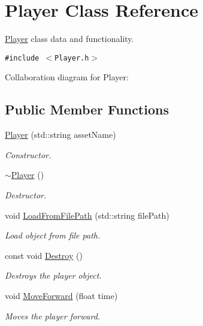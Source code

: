 \hypertarget{class_player}{
\section{Player Class Reference}
\label{class_player}
}
\hyperlink{class_player}{Player} class data and functionality.  


{\tt \#include $<$Player.h$>$}

Collaboration diagram for Player:\subsection*{Public Member Functions}
\begin{CompactItemize}
\item 
\hyperlink{class_player_1608a9c58abd8e3a681f683672b25601}{Player} (std::string assetName)
\begin{CompactList}\small\item\em Constructor. \item\end{CompactList}\item 
\hyperlink{class_player_749d2c00e1fe0f5c2746f7505a58c062}{$\sim$Player} ()
\begin{CompactList}\small\item\em Destructor. \item\end{CompactList}\item 
void \hyperlink{class_player_394737f2360c0e14e21401044ffe74ff}{LoadFromFilePath} (std::string filePath)
\begin{CompactList}\small\item\em Load object from file path. \item\end{CompactList}\item 
const void \hyperlink{class_player_e275691f90f93b0cf6134b2626da5e39}{Destroy} ()
\begin{CompactList}\small\item\em Destroys the player object. \item\end{CompactList}\item 
void \hyperlink{class_player_afa223a6906cf925ac0f9ae1ad197cde}{MoveForward} (float time)
\begin{CompactList}\small\item\em Moves the player forward. \item\end{CompactList}\item 

\end{CompactItemize}
